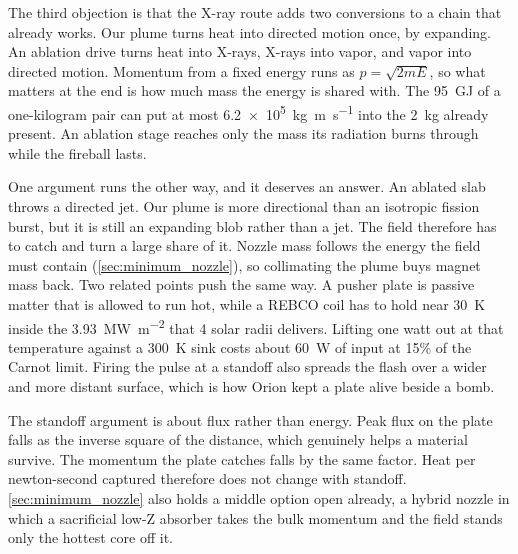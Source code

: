 \documentclass{article}
\begin{document}
The third objection is that the X-ray route adds two conversions to a chain that already works. Our plume turns heat into directed motion once, by expanding. An ablation drive turns heat into X-rays, X-rays into vapor, and vapor into directed motion. Momentum from a fixed energy runs as $p = \sqrt{2mE}$, so what matters at the end is how much mass the energy is shared with. The \SI{95}{\giga\joule} of a one-kilogram pair can put at most \SI{6.2e5}{\kilogram\meter\per\second} into the \SI{2}{\kilo\gram} already present. An ablation stage reaches only the mass its radiation burns through while the fireball lasts.

One argument runs the other way, and it deserves an answer. An ablated slab throws a directed jet. Our plume is more directional than an isotropic fission burst, but it is still an expanding blob rather than a jet. The field therefore has to catch and turn a large share of it. Nozzle mass follows the energy the field must contain (\autoref{sec:minimum_nozzle}), so collimating the plume buys magnet mass back. Two related points push the same way. A pusher plate is passive matter that is allowed to run hot, while a REBCO coil has to hold near \SI{30}{\kelvin} inside the \SI{3.93}{\mega\watt\per\square\meter} that 4 solar radii delivers. Lifting one watt out at that temperature against a \SI{300}{\kelvin} sink costs about \SI{60}{\watt} of input at 15\% of the Carnot limit. Firing the pulse at a standoff also spreads the flash over a wider and more distant surface, which is how Orion kept a plate alive beside a bomb.

The standoff argument is about flux rather than energy. Peak flux on the plate falls as the inverse square of the distance, which genuinely helps a material survive. The momentum the plate catches falls by the same factor. Heat per newton-second captured therefore does not change with standoff. \autoref{sec:minimum_nozzle} also holds a middle option open already, a hybrid nozzle in which a sacrificial low-Z absorber takes the bulk momentum and the field stands only the hottest core off it.
\end{document}
